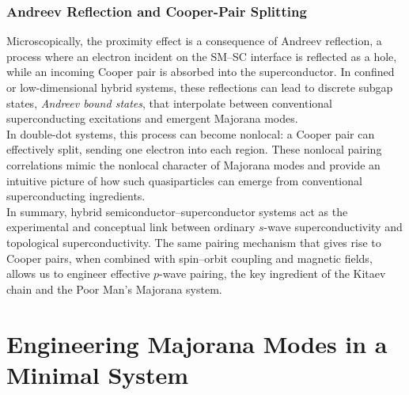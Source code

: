 \documentclass[11pt, letterpaper, titlepage]{article}
\begin{document}
\subsubsection{Andreev Reflection and Cooper-Pair Splitting}
Microscopically, the proximity effect is a consequence of Andreev reflection, a process where an electron incident on the SM–SC interface is reflected as a hole, while an incoming Cooper pair is absorbed into the superconductor. In confined or low-dimensional hybrid systems, these reflections can lead to discrete subgap states, \textit{Andreev bound states}, that interpolate between conventional superconducting excitations and emergent Majorana modes.\\
In double-dot systems, this process can become nonlocal: a Cooper pair can effectively split, sending one electron into each region. These nonlocal pairing correlations mimic the nonlocal character of Majorana modes and provide an intuitive picture of how such quasiparticles can emerge from conventional superconducting ingredients.\\
In summary, hybrid semiconductor–superconductor systems act as the experimental and conceptual link between ordinary $s$-wave superconductivity and topological superconductivity. The same pairing mechanism that gives rise to Cooper pairs, when combined with spin–orbit coupling and magnetic fields, allows us to engineer effective $p$-wave pairing, the key ingredient of the Kitaev chain and the Poor Man’s Majorana system.
























\section{Engineering Majorana Modes in a Minimal System}
\end{document}
